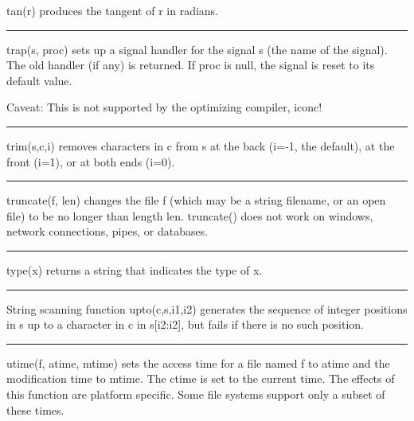 \noindent
{}\textsf{tan(r)} produces the tangent of \textsf{r} in
radians.

\bigskip\hrule\vspace{0.1cm}

\noindent
{}\textsf{trap(s, proc)} sets up a signal handler for
the signal \textsf{s} (the name of the signal). The old handler (if
any) is returned. If \textsf{proc} is null, the signal is reset to its
default value. 

Caveat: This is not supported by the optimizing
compiler, iconc!

\bigskip\hrule\vspace{0.1cm}

\noindent
{}\textsf{trim(s,c,i)} removes characters in \textsf{c}
from \textsf{s} at the back (\textsf{i}=-1, the default), at the front
(\textsf{i}=1), or at both ends (\textsf{i}=0).

\bigskip\hrule\vspace{0.1cm}

\noindent
{}\textsf{truncate(f, len)} changes the file
\textsf{f} (which may be a string filename, or an open file) to be no
longer than length \textsf{len}. \textsf{truncate()} does not work on
windows, network connections, pipes, or databases.

\bigskip\hrule\vspace{0.1cm}

\noindent
{}\textsf{type(x)} returns a string that indicates the type
of \textsf{x}.

\bigskip\hrule\vspace{0.1cm}

\noindent
String scanning function \textsf{upto(c,s,i1,i2)}
generates the sequence of integer positions in \textsf{s} up to a
character in \textsf{c} in \textsf{s[i2:i2]}, but fails if there is no
such position.

\bigskip\hrule\vspace{0.1cm}

\noindent
\textsf{utime(f, atime, mtime)} sets the access
time for a file named \textsf{f} to \textsf{atime} and the modification
time to \textsf{mtime}. The \textsf{ctime} is set to the current time.
The effects of this function are platform specific. Some file systems
support only a subset of these times.


